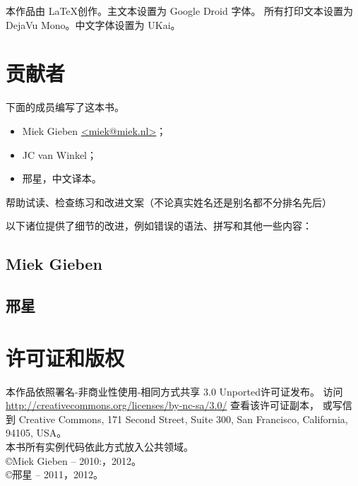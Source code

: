 \noindent{}本作品由 \LaTeX 创作。主文本设置为 Google Droid 字体。
所有打印文本设置为 DejaVu Mono。中文字体设置为 UKai。

\section{贡献者}
下面的成员编写了这本书。
\begin{itemize}
\item{Miek Gieben \qquad\url{<miek@miek.nl>}}；
\item{JC van Winkel}；
\item{邢星，中文译本}。
\end{itemize}

帮助试读、检查练习和改进文案（不论真实姓名还是别名都不分排名先后）


以下诸位提供了细节的改进，例如错误的语法、拼写和其他一些内容：


\subsection{Miek Gieben}


\subsection{邢星}


\section{许可证和版权}

本作品依照署名-非商业性使用-相同方式共享 3.0 Unported许可证发布。
访问 \url{http://creativecommons.org/licenses/by-nc-sa/3.0/} 查看该许可证副本，
或写信到 Creative Commons, 171 Second Street, Suite 300,
San Francisco, California, 94105, USA。\\
本书所有实例代码依此方式放入公共领域。\\
\copyright Miek Gieben -- 2010:，2012。\\
\copyright 邢星 -- 2011，2012。
